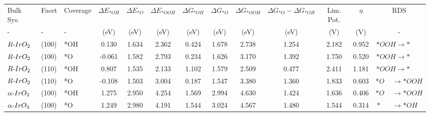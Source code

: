 \begin{tabular}{lllcccccccccc}
\toprule
                Bulk Sys. &    Facet &    Coverage & $\Delta E_{*OH}$ & $\Delta E_{*O}$ & $\Delta E_{*OOH}$ & $\Delta G_{*OH}$ & $\Delta G_{*O}$ & $\Delta G_{*OOH}$ & $\Delta G_{*O}-\Delta G_{*OH}$ & Lim. Pot. & $\eta$ &                                                                    RDS \\
                        - &        - &           - &             (eV) &            (eV) &              (eV) &             (eV) &            (eV) &              (eV) &                           (eV) &       (V) &    (V) &                                                                      - \\
\midrule
      $R{\text -}IrO_{2}$ &    (100) &         *OH &            0.130 &           1.634 &             2.362 &            0.424 &           1.678 &             2.738 &                          1.254 &     2.182 &  0.952 &              $*OOH \rightarrow * \phantom{T} \phantom{T} \phantom{T} $ \\
      $R{\text -}IrO_{2}$ &    (100) &          *O &           -0.061 &           1.582 &             2.793 &            0.234 &           1.626 &             3.170 &                          1.392 &     1.750 &  0.520 &              $*OOH \rightarrow * \phantom{T} \phantom{T} \phantom{T} $ \\
      $R{\text -}IrO_{2}$ &    (110) &         *OH &            0.807 &           1.535 &             2.133 &            1.102 &           1.579 &             2.509 &                          0.477 &     2.411 &  1.181 &              $*OOH \rightarrow * \phantom{T} \phantom{T} \phantom{T} $ \\
      $R{\text -}IrO_{2}$ &    (110) &          *O &           -0.108 &           1.503 &             3.004 &            0.187 &           1.547 &             3.380 &                          1.360 &     1.833 &  0.603 &                         $*O \phantom{T} \phantom{T}  \rightarrow *OOH$ \\
 $\alpha{\text -}IrO_{3}$ &    (100) &         *OH &            1.275 &           2.950 &             4.254 &            1.569 &           2.994 &             4.630 &                          1.424 &     1.636 &  0.406 &                         $*O \phantom{T} \phantom{T}  \rightarrow *OOH$ \\
 $\alpha{\text -}IrO_{3}$ &    (100) &          *O &            1.249 &           2.980 &             4.191 &            1.544 &           3.024 &             4.567 &                          1.480 &     1.544 &  0.314 &  $* \phantom{T} \phantom{T} \phantom{T}  \rightarrow *OH \phantom{T} $ \\

\end{tabular}
